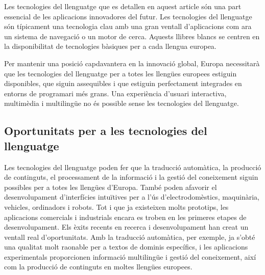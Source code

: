 \begin{multicols}{2}
Les tecnologies del llenguatge que es detallen en aquest article són una part essencial de les aplicacions innovadores del futur. Les tecnologies del llenguatge són típicament una tecnologia clau amb una gran ventall d’aplicacions com ara un sistema de navegació o un motor de cerca. Aquests llibres blancs se centren en la disponibilitat de tecnologies bàsiques per a cada llengua europea.


Per mantenir una posició capdavantera en la innovació global, Europa necessitarà que les tecnologies del llenguatge per a totes les llengües europees estiguin disponibles, que siguin assequibles i que estiguin perfectament integrades en entorns de programari més grans.  Una experiència d’usuari interactiva, multimèdia i multilingüe no és possible sense les tecnologies del llenguatge.

\subsection{Oportunitats per a les tecnologies del llenguatge}

Les tecnologies del llenguatge poden fer que la traducció automàtica, la producció de continguts, el processament de la informació i la gestió del coneixement siguin possibles per a totes les llengües d’Europa. També poden afavorir el desenvolupament d’interfícies intuïtives  per a l'ús d'electrodomèstics, maquinària, vehicles, ordinadors i robots. Tot i que ja existeixen molts prototips, les aplicacions comercials i industrials encara es troben en les primeres etapes de desenvolupament. Els èxits recents en recerca i desenvolupament han creat un ventall real d’oportunitats. Amb la traducció automàtica, per exemple, ja s’obté una qualitat molt raonable per a textos de dominis específics, i les aplicacions experimentals proporcionen informació multilingüe i gestió del coneixement, així com la producció de continguts en moltes llengües europees.


\end{multicols}
